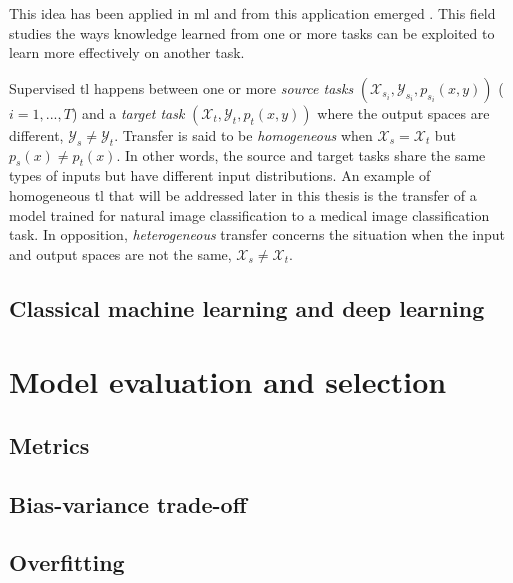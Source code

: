 This idea has been applied in \acrlong{ml} and from this application emerged  \parencite{yang2020transfer}. This field studies the ways knowledge learned from one or more tasks can be exploited to learn more effectively on another task. 

Supervised \acrlong{tl} happens between one or more \textit{source tasks} $\left(\mathcal{X}_{s_i}, \mathcal{Y}_{s_i}, p_{s_i}(x, y)\right)$ ($i = 1,...,T$) and a \textit{target task} $\left(\mathcal{X}_t, \mathcal{Y}_t, p_t(x, y)\right)$ where the output spaces are different, $\mathcal{Y}_s \neq \mathcal{Y}_t$. Transfer is said to be \textit{homogeneous} when $\mathcal{X}_s = \mathcal{X}_t$ but $p_s(x) \neq p_t(x)$. In other words, the source and target tasks share the same types of inputs but have different input distributions. An example of homogeneous \acrlong{tl} that will be addressed later in this thesis is the transfer of a model trained for natural image classification to a medical image classification task. In opposition, \textit{heterogeneous} transfer concerns the situation when the input and output spaces are not the same, $\mathcal{X}_s \neq \mathcal{X}_t$.


\subsection{Classical machine learning and deep learning}



\section{Model evaluation and selection}

\subsection{Metrics}

\subsection{Bias-variance trade-off}

\subsection{Overfitting}

